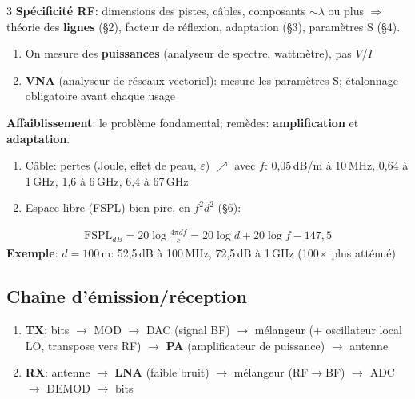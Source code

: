 \documentclass[12pt, a4paper]{article}
\begin{document}
\begin{multicols*}{3}
	\textbf{Spécificité RF}: dimensions des pistes, câbles, composants $\sim\lambda$ ou plus $\Rightarrow$ théorie des \textbf{lignes} (§2), facteur de réflexion, adaptation (§3), paramètres S (§4).
	\begin{enumerate}[\roman*.]
		\item On mesure des \textbf{puissances} (analyseur de spectre, wattmètre), pas $V$/$I$
		\item \textbf{VNA} (analyseur de réseaux vectoriel): mesure les paramètres S; étalonnage obligatoire avant chaque usage
	\end{enumerate}

	\colbreak
	\textbf{Affaiblissement}: le problème fondamental; remèdes: \textbf{amplification} et \textbf{adaptation}.
	\begin{enumerate}[\roman*.]
		\item Câble: pertes (Joule, effet de peau, $\varepsilon$) $\nearrow$ avec $f$: 0,05\,dB/m à 10\,MHz, 0,64 à 1\,GHz, 1,6 à 6\,GHz, 6,4 à 67\,GHz
		\item Espace libre (FSPL) bien pire, en $f^2d^2$ (§6):
	\end{enumerate}
	\begin{gather*}
		\mathrm{FSPL}_{dB}=20\log\frac{4\pi df}{c}=20\log d+20\log f-147{,}5
	\end{gather*}
	\textbf{Exemple}: $d=100$\,m: 52,5\,dB à 100\,MHz, 72,5\,dB à 1\,GHz (100$\times$ plus atténué)

	\subsection{Chaîne d'émission/réception}
	\begin{enumerate}[\roman*.]
		\item \textbf{TX}: bits $\to$ MOD $\to$ DAC (signal BF) $\to$ mélangeur (+ oscillateur local LO, transpose vers RF) $\to$ \textbf{PA} (amplificateur de puissance) $\to$ antenne
		\item \textbf{RX}: antenne $\to$ \textbf{LNA} (faible bruit) $\to$ mélangeur (RF$\to$BF) $\to$ ADC $\to$ DEMOD $\to$ bits
	\end{enumerate}


\end{multicols*}
\end{document}
